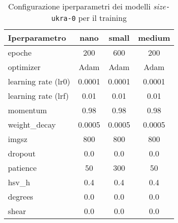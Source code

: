 \begin{table}[!htb]
    \centering
    \begin{tabular}{lccc}
        \hline
        \textbf{Iperparametro} & \textbf{nano} & \textbf{small} & \textbf{medium}\\
        \hline
        epoche & 200 & 600 & 200 \\
        optimizer & Adam & Adam & Adam\\
        learning rate (lr0) & 0.0001 & 0.0001 & 0.0001\\
        learning rate (lrf) & 0.01 & 0.01 & 0.01\\
        momentum & 0.98 & 0.98 & 0.98\\
        weight\_decay & 0.0005 & 0.0005 & 0.0005\\
        imgsz & 800 & 800 & 800\\
        dropout & 0.0 & 0.0 & 0.0 \\
        patience & 50 & 300 & 50\\
        \midrule
        hsv\_h & 0.4 & 0.4 & 0.4 \\
        degrees & 0.0 & 0.0 & 0.0  \\
        shear & 0.0 & 0.0 & 0.0 \\
        \hline
    \end{tabular}
    \caption{Configurazione iperparametri dei modelli \textit{size}\texttt{-ukra-0} per il training}
    \label{tab:v5-model-configs}
    \end{table}

    




